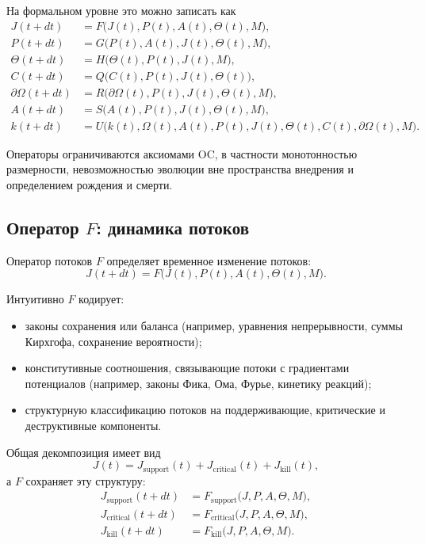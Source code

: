 На формальном уровне это можно записать как
\begin{align*}
  J(t+dt)              &= F\big(J(t), P(t), A(t), \Theta(t), M\big), \\
  P(t+dt)              &= G\big(P(t), A(t), J(t), \Theta(t), M\big), \\
  \Theta(t+dt)         &= H\big(\Theta(t), P(t), J(t), M\big), \\
  C(t+dt)              &= Q\big(C(t), P(t), J(t), \Theta(t)\big), \\
  \partial\Omega(t+dt) &= R\big(\partial\Omega(t), P(t), J(t), \Theta(t), M\big), \\
  A(t+dt)              &= S\big(A(t), P(t), J(t), \Theta(t), M\big), \\
  k(t+dt)              &= U\big(k(t), \Omega(t), A(t), P(t), J(t),
                               \Theta(t), C(t), \partial\Omega(t), M\big).
\end{align*}

Операторы ограничиваются аксиомами OC, в частности монотонностью размерности,
невозможностью эволюции вне пространства внедрения и определением рождения и
смерти.

\subsection{Оператор \texorpdfstring{\texorpdfstring{$F$}{F}}{F}: динамика потоков}

Оператор потоков \(F\) определяет временное изменение потоков:
\[
  J(t+dt) = F\big(J(t), P(t), A(t), \Theta(t), M\big).
\]

Интуитивно \(F\) кодирует:
\begin{itemize}
  \item законы сохранения или баланса (например, уравнения непрерывности,
        суммы Кирхгофа, сохранение вероятности);
  \item конститутивные соотношения, связывающие потоки с градиентами потенциалов
        (например, законы Фика, Ома, Фурье, кинетику реакций);
  \item структурную классификацию потоков на поддерживающие, критические и
        деструктивные компоненты.
\end{itemize}

Общая декомпозиция имеет вид
\[
  J(t) = J_{\mathrm{support}}(t)
       + J_{\mathrm{critical}}(t)
       + J_{\mathrm{kill}}(t),
\]
а \(F\) сохраняет эту структуру:
\begin{align*}
  J_{\mathrm{support}}(t+dt)
    &= F_{\mathrm{support}}\big(J, P, A, \Theta, M\big), \\
  J_{\mathrm{critical}}(t+dt)
    &= F_{\mathrm{critical}}\big(J, P, A, \Theta, M\big), \\
  J_{\mathrm{kill}}(t+dt)
    &= F_{\mathrm{kill}}\big(J, P, A, \Theta, M\big).
\end{align*}

